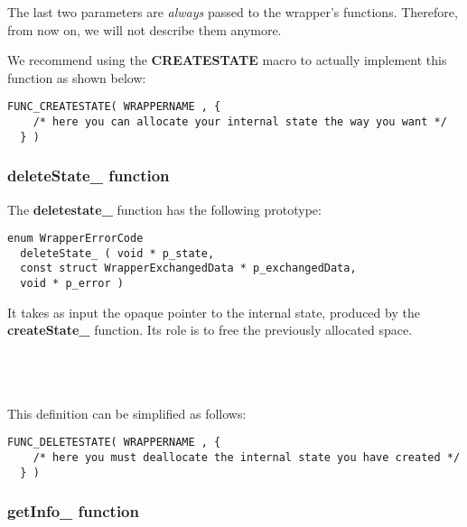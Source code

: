 The last two parameters are \emph{always} passed to the wrapper's functions. Therefore, from now on, we will not describe them anymore.

We recommend using the {\bf CREATESTATE} macro to actually implement this function as shown below:
\lstset{language=C++, basicstyle=\normalsize}
\begin{lstlisting}[frame=TBRL]
  FUNC_CREATESTATE( WRAPPERNAME , {
    /* here you can allocate your internal state the way you want */
  } )
\end{lstlisting}

\subsubsection{deleteState\_ function}

The {\bf deletestate\_} function has the following prototype:

\lstset{language=C++, basicstyle=\normalsize}
\begin{lstlisting}[frame=TBRL]
  enum WrapperErrorCode
  deleteState_ ( void * p_state,
  const struct WrapperExchangedData * p_exchangedData,
  void * p_error )
\end{lstlisting}

It takes  as input the opaque pointer to the internal state, produced by the {\bf createState\_} function. Its role is to free the previously allocated space.

\ \\
\ \\
\ \\

This definition can be simplified as follows:
\lstset{language=C++, basicstyle=\normalsize}
\begin{lstlisting}[frame=TBRL]
  FUNC_DELETESTATE( WRAPPERNAME , {
    /* here you must deallocate the internal state you have created */
  } )
\end{lstlisting}

\subsubsection{getInfo\_ function}

